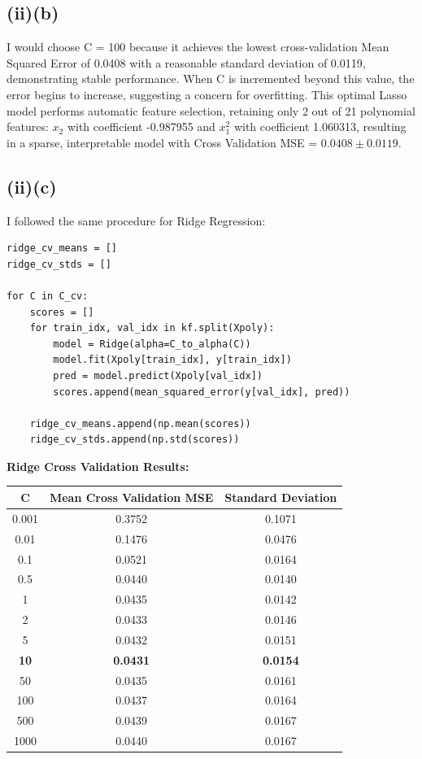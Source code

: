 \documentclass[11pt,a4paper]{article}
\begin{document}
\subsection*{(ii)(b)}

I would choose C = 100 because it achieves the lowest cross-validation Mean Squared Error of 0.0408 with a reasonable standard deviation of 0.0119, demonstrating stable performance. When C is incremented beyond this value, the error begins to increase, suggesting a concern for overfitting. This optimal Lasso model performs automatic feature selection, retaining only 2 out of 21 polynomial features: $x_2$ with coefficient -0.987955 and $x_1^2$ with coefficient 1.060313, resulting in a sparse, interpretable model with Cross Validation MSE = $0.0408 \pm 0.0119$.

\subsection*{(ii)(c)}

I followed the same procedure for Ridge Regression:

\begin{lstlisting}
ridge_cv_means = []
ridge_cv_stds = []

for C in C_cv:
    scores = []
    for train_idx, val_idx in kf.split(Xpoly):
        model = Ridge(alpha=C_to_alpha(C))
        model.fit(Xpoly[train_idx], y[train_idx])
        pred = model.predict(Xpoly[val_idx])
        scores.append(mean_squared_error(y[val_idx], pred))
    
    ridge_cv_means.append(np.mean(scores))
    ridge_cv_stds.append(np.std(scores))
\end{lstlisting}

\textbf{Ridge Cross Validation Results:}

\begin{table}[H]
\centering
\begin{tabular}{ccc}
\toprule
C & Mean Cross Validation MSE & Standard Deviation \\
\midrule
0.001 & 0.3752 & 0.1071 \\
0.01 & 0.1476 & 0.0476 \\
0.1 & 0.0521 & 0.0164 \\
0.5 & 0.0440 & 0.0140 \\
1 & 0.0435 & 0.0142 \\
2 & 0.0433 & 0.0146 \\
5 & 0.0432 & 0.0151 \\
\textbf{10} & \textbf{0.0431} & \textbf{0.0154} \\
50 & 0.0435 & 0.0161 \\
100 & 0.0437 & 0.0164 \\
500 & 0.0439 & 0.0167 \\
1000 & 0.0440 & 0.0167 \\
\bottomrule
\end{tabular}
\end{table}
\end{document}
